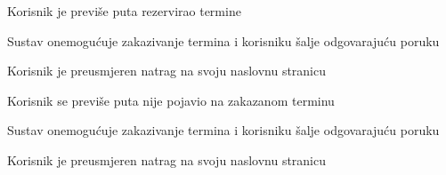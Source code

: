 \begin{packed_item}
						\item[] \begin{packed_item}
	
							\item[2.a] Korisnik je previše puta rezervirao termine
							\item[] \begin{packed_enum}
								
								\item Sustav onemogućuje zakazivanje termina i korisniku šalje odgovarajuću poruku
								\item Korisnik je preusmjeren natrag na svoju naslovnu stranicu
							\end{packed_enum}
							
							\item[2.b] Korisnik se previše puta nije pojavio na zakazanom terminu
							\item[] \begin{packed_enum}
								
								\item Sustav onemogućuje zakazivanje termina i korisniku šalje odgovarajuću poruku
								\item Korisnik je preusmjeren natrag na svoju naslovnu stranicu
							\end{packed_enum}
						\end{packed_item}
					\end{packed_item}
					
